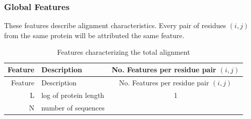\documentclass[12pt,a4paper,twoside]{book}
\theoremstyle{definition}
\theoremstyle{definition}
\theoremstyle{remark}
\begin{document}
\subsubsection{Global Features}\label{seq-features-global}

These features describe alignment characteristics. Every pair of
residues \((i,j)\) from the same protein will be attributed the same
feature.

\begin{longtable}[]{@{}rlc@{}}
\caption{Features characterizing the total alignment}\tabularnewline
\toprule
\begin{minipage}[b]{0.23\columnwidth}\raggedleft\strut
Feature\strut
\end{minipage} & \begin{minipage}[b]{0.50\columnwidth}\raggedright\strut
Description\strut
\end{minipage} & \begin{minipage}[b]{0.18\columnwidth}\centering\strut
No. Features per residue pair \((i, j)\)\strut
\end{minipage}\tabularnewline
\midrule
\endfirsthead
\toprule
\begin{minipage}[b]{0.23\columnwidth}\raggedleft\strut
Feature\strut
\end{minipage} & \begin{minipage}[b]{0.50\columnwidth}\raggedright\strut
Description\strut
\end{minipage} & \begin{minipage}[b]{0.18\columnwidth}\centering\strut
No. Features per residue pair \((i, j)\)\strut
\end{minipage}\tabularnewline
\midrule
\endhead
\begin{minipage}[t]{0.23\columnwidth}\raggedleft\strut
L\strut
\end{minipage} & \begin{minipage}[t]{0.50\columnwidth}\raggedright\strut
log of protein length\strut
\end{minipage} & \begin{minipage}[t]{0.18\columnwidth}\centering\strut
1\strut
\end{minipage}\tabularnewline
\begin{minipage}[t]{0.23\columnwidth}\raggedleft\strut
N\strut
\end{minipage} & \begin{minipage}[t]{0.50\columnwidth}\raggedright\strut
number of sequences\strut
\end{minipage} & \begin{minipage}[t]{0.18\columnwidth}\centering\strut

\end{minipage}
\end{longtable}
\end{document}
